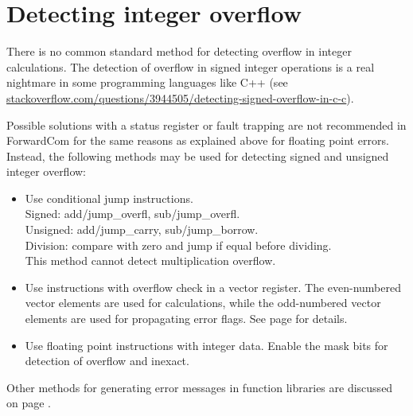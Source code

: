 \documentclass[forwardcom.tex]{subfiles}
\begin{document}
\section{Detecting integer overflow} 
\label{integerOverflowDetection}
There is no common standard method for detecting overflow in integer calculations. The detection of overflow in signed integer operations is a real nightmare in some programming languages like C++ (see 
\href{https://stackoverflow.com/questions/3944505/detecting-signed-overflow-in-c-c}{stackoverflow.com/questions/3944505/detecting-signed-overflow-in-c-c}).
\vv

Possible solutions with a status register or fault trapping are not recommended in ForwardCom for the same reasons as explained above for floating point errors. 
Instead, the following methods may be used for detecting signed and unsigned integer overflow: 

\begin{itemize}
  \item Use conditional jump instructions. \\
    Signed: add/jump\_overfl, sub/jump\_overfl. \\
    Unsigned: add/jump\_carry, sub/jump\_borrow. \\
    Division: compare with zero and jump if equal before dividing. \\
    This method cannot detect multiplication overflow.  
  
  \item Use instructions with overflow check in a vector register. 
    The even-numbered vector elements are used for calculations, while
    the odd-numbered vector elements are used for propagating error flags. 
    See page \pageref{table:addOcInstruction} for details. 
    
  \item Use floating point instructions with integer data. 
    Enable the mask bits for detection of overflow and inexact.
  
\end{itemize}
\vv

Other methods for generating error messages in function libraries are discussed on page \pageref{errorMessageHandling}.
\vv
\end{document}
